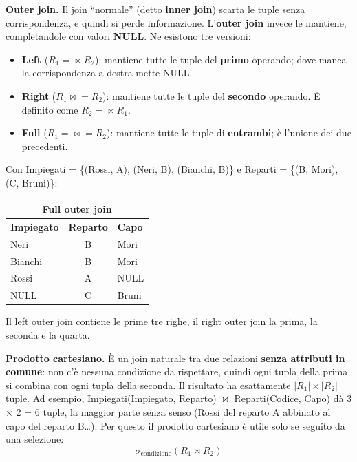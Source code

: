 \documentclass[12pt]{extarticle}
\begin{document}
\noindent \textbf{Outer join.} Il join ``normale'' (detto \textbf{inner join}) scarta le tuple senza corrispondenza, e quindi si perde informazione. L'\textbf{outer join} invece le mantiene, completandole con valori \textbf{NULL}. Ne esistono tre versioni:
\begin{itemize}
    \item \textbf{Left} ($R_1 \mathbin{=\!\!\!\bowtie} R_2$): mantiene tutte le tuple del \textbf{primo} operando; dove manca la corrispondenza a destra mette NULL.
    \item \textbf{Right} ($R_1 \mathbin{\bowtie\!\!\!=} R_2$): mantiene tutte le tuple del \textbf{secondo} operando. È definito come $R_2 \mathbin{=\!\!\!\bowtie} R_1$.
    \item \textbf{Full} ($R_1 \mathbin{=\!\!\!\bowtie\!\!\!=} R_2$): mantiene tutte le tuple di \textbf{entrambi}; è l'unione dei due precedenti.
\end{itemize}

\noindent Con Impiegati = \{(Rossi, A), (Neri, B), (Bianchi, B)\} e Reparti = \{(B, Mori), (C, Bruni)\}:
\begin{center}
\small
\begin{tabular}{lcl}
    \toprule
    \multicolumn{3}{c}{\textbf{Full outer join}} \\
    \midrule
    \textbf{Impiegato} & \textbf{Reparto} & \textbf{Capo} \\
    \midrule
    Neri & B & Mori \\
    Bianchi & B & Mori \\
    Rossi & A & NULL \\
    NULL & C & Bruni \\
    \bottomrule
\end{tabular}
\end{center}
Il left outer join contiene le prime tre righe, il right outer join la prima, la seconda e la quarta.

\medskip
\noindent \textbf{Prodotto cartesiano.} È un join naturale tra due relazioni \textbf{senza attributi in comune}: non c'è nessuna condizione da rispettare, quindi ogni tupla della prima si combina con ogni tupla della seconda. Il risultato ha esattamente $|R_1| \times |R_2|$ tuple. Ad esempio, Impiegati(Impiegato, Reparto) $\bowtie$ Reparti(Codice, Capo) dà 3 $\times$ 2 = 6 tuple, la maggior parte senza senso (Rossi del reparto A abbinato al capo del reparto B\dots). Per questo il prodotto cartesiano è utile solo se seguito da una selezione:
\[
\sigma_{\text{condizione}}(R_1 \bowtie R_2)
\]
\end{document}

